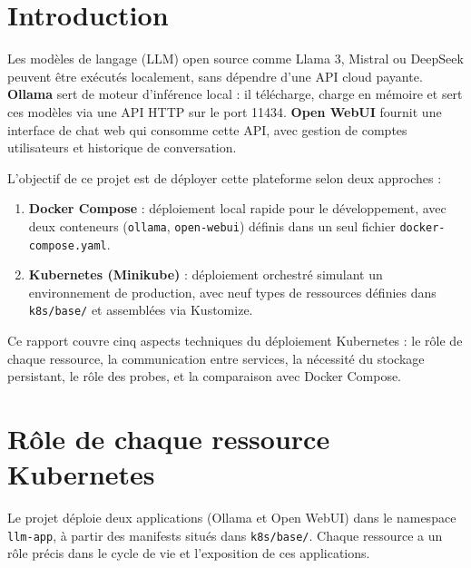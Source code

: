 \documentclass[11pt,a4paper]{article}
\begin{document}
\thispagestyle{empty}
\tableofcontents

\newpage
{}
\setcounter{page}{1}

\section{Introduction}

Les modèles de langage (LLM) open source comme Llama 3, Mistral ou DeepSeek peuvent être exécutés localement, sans dépendre d'une API cloud payante. \textbf{Ollama} sert de moteur d'inférence local : il télécharge, charge en mémoire et sert ces modèles via une API HTTP sur le port 11434. \textbf{Open WebUI} fournit une interface de chat web qui consomme cette API, avec gestion de comptes utilisateurs et historique de conversation.

L'objectif de ce projet est de déployer cette plateforme selon deux approches :

\begin{enumerate}[leftmargin=1.2cm]
    \item \textbf{Docker Compose} : déploiement local rapide pour le développement, avec deux conteneurs (\texttt{ollama}, \texttt{open-webui}) définis dans un seul fichier \texttt{docker-compose.yaml}.
    \item \textbf{Kubernetes (Minikube)} : déploiement orchestré simulant un environnement de production, avec neuf types de ressources définies dans \texttt{k8s/base/} et assemblées via Kustomize.
\end{enumerate}

Ce rapport couvre cinq aspects techniques du déploiement Kubernetes : le rôle de chaque ressource, la communication entre services, la nécessité du stockage persistant, le rôle des probes, et la comparaison avec Docker Compose.

\section{Rôle de chaque ressource Kubernetes}

Le projet déploie deux applications (Ollama et Open WebUI) dans le namespace \texttt{llm-app}, à partir des manifests situés dans \texttt{k8s/base/}. Chaque ressource a un rôle précis dans le cycle de vie et l'exposition de ces applications.
\end{document}
